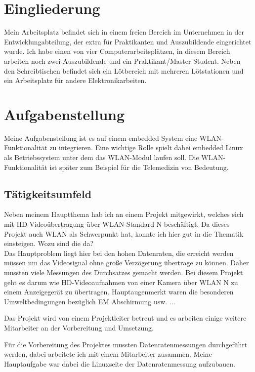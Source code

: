 \documentclass[pdftex,12pt,a4paper]{scrreprt}
\begin{document}
\section{Eingliederung}
Mein Arbeitsplatz befindet sich in einem freien Bereich im Unternehmen in der Entwicklungabteilung,
der extra für Praktikanten und Auszubildende eingerichtet wurde.
Ich habe einen von vier Computerarbeitsplätzen, in diesem Bereich arbeiten noch zwei Auszubildende und ein Praktikant/Master-Student.
Neben den Schreibtischen befindet sich ein Lötbereich mit mehreren Lötstationen und ein Arbeitsplatz für andere Elektronikarbeiten.
\section{Aufgabenstellung}
Meine Aufgabenstellung ist es auf einem embedded System eine WLAN-Funktionalität zu integrieren.
Eine wichtige Rolle spielt dabei embedded Linux als Betriebssystem unter dem das WLAN-Modul laufen soll.
Die WLAN-Funktionalität ist später zum Beispiel für die Telemedizin von Bedeutung.
\subsection{Tätigkeitsumfeld}
Neben meinem Hauptthema hab ich an einem Projekt mitgewirkt, welches sich mit HD-Videoübertragung über WLAN-Standard N beschäftigt.
Da dieses Projekt auch WLAN als Schwerpunkt hat, konnte ich hier gut in die Thematik einsteigen. Wozu sind die da?\\
Das Hauptproblem liegt hier bei den hohen Datenraten, die erreicht werden müssen um das Videosignal ohne große Verzögerung übertrage zu können. Daher mussten viele Messungen des Durchsatzes gemacht werden.
Bei diesem Projekt geht es darum wie HD-Videoaufnahmen von einer Kamera
über WLAN N zu einem Anzeigegerät zu übertragen. Hauptaugenmerkt waren
die besonderen Umweltbedingungen bezüglich EM Abschirmung usw. ...

Das Projekt wird von einem Projektleiter betreut und es arbeiten einige weitere Mitarbeiter an der Vorbereitung und Umsetzung.

Für die Vorbereitung des Projektes mussten Datenratenmessungen durchgeführt werden, dabei arbeitete ich mit einem Mitarbeiter zusammen.
Meine Hauptaufgabe war dabei die Linuxseite der Datenratenmessung aufzubauen.
\end{document}
